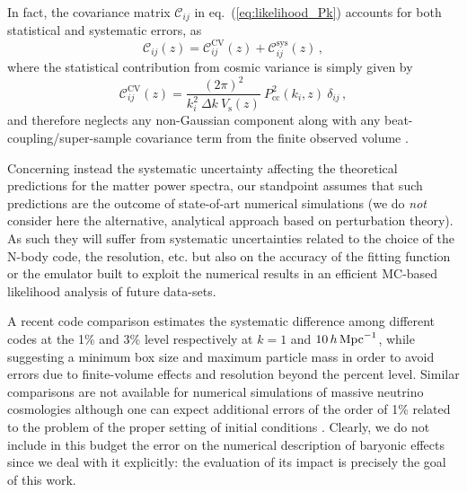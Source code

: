 \documentclass[a4paper,11pt]{article}
\newcommand{\be}{\begin{equation}}
\newcommand{\ee}{\end{equation}}
\def\kMpc{\, h \, {\rm Mpc}^{-1}}
\newcommand{\eq}[1]{eq.~(\ref{#1})}
\begin{document}
In fact, the covariance matrix $\mathcal C_{ij}$ in \eq{eq:likelihood_Pk} accounts for both statistical and systematic errors, as 
\be
\mathcal{C}_{ij}(z) =
\mathcal{C}^\mathrm{CV}_{ij}(z) + \mathcal{C}^\mathrm{sys}_{ij}(z) \,,
\ee
where the statistical contribution from cosmic variance is simply given by
\be
\mathcal{C}^\mathrm{CV}_{ij}(z) =
\frac{(2\pi)^2}{k_i^2 \ \Delta k \  V_\mathrm s(z)}  \ P_\textrm{cc}^2(k_i,z)\ \delta_{ij} \,,
\ee
and therefore neglects any non-Gaussian component along with any beat-coupling/super-sample covariance term from the finite observed volume
\cite{Bispectrum-Sefusatti+06, Covariance-Hamilton+05, Super_sample_covariance-Takada+13}.

Concerning instead the systematic uncertainty affecting the theoretical predictions for the matter power spectra, our standpoint assumes that such predictions are the outcome of state-of-art numerical simulations (we do {\em not} consider here the alternative, analytical approach based on perturbation theory). As such they will suffer from systematic uncertainties related to the choice of the N-body code, the resolution, etc. but also on the accuracy of the fitting function or the emulator built to exploit the numerical results in an efficient MC-based likelihood analysis of future data-sets.     

A recent code comparison \cite{Precision_Pk-Schneider+16} estimates the systematic difference among different codes at the 1\% and 3\% level respectively at $k=1$ and $10\kMpc$, while suggesting a minimum box size and maximum particle mass in order to avoid errors due to finite-volume effects and resolution beyond the percent level. Similar comparisons are not available for numerical simulations of massive neutrino cosmologies although one can expect additional errors of the order of 1\% related to the problem of the proper setting of initial conditions \cite{Zennaro+17}. Clearly, we do not include in this budget the error on the numerical description of baryonic effects since we deal with it explicitly: the evaluation of its impact is precisely the goal of this work.  
\end{document}
